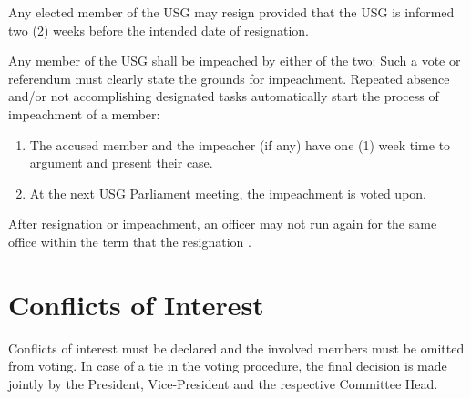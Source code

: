 {	\protect\begin{parenum}
		\item Any elected member of the USG may resign provided that the USG is informed two (2) weeks before the intended date of resignation.		
		\item Any member of the USG shall be impeached by either of the two: Such a vote or referendum must clearly state the grounds for impeachment. Repeated absence  and/or not accomplishing designated tasks automatically start the process of impeachment of a member:
		\begin{enumerate}
			\item The accused member and the impeacher (if any) have one (1) week time to argument and present their case.
			\item At the next \hyperref[USGParliamentDef]{USG Parliament} meeting, the impeachment is voted upon.
		\end{enumerate}
		
		\item After resignation or impeachment, an officer may not run again for the same office within the term that the resignation .
	\end{parenum}

	\protect\section{Conflicts of Interest}
	Conflicts of interest must be declared and the involved members must be omitted from voting. In case of a tie in the voting procedure, the final decision is made jointly by the President, Vice-President and the respective Committee Head.
	
}